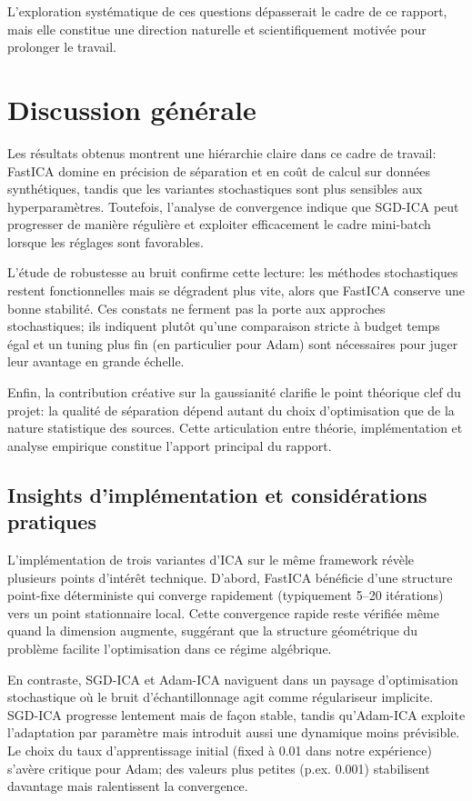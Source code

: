 \documentclass[11pt,a4paper]{article}
\begin{document}
L'exploration systématique de ces questions dépasserait le cadre de ce rapport, mais elle constitue une direction naturelle et scientifiquement motivée pour prolonger le travail.

\section{Discussion générale}

Les résultats obtenus montrent une hiérarchie claire dans ce cadre de travail: FastICA domine en précision de séparation et en coût de calcul sur données synthétiques, tandis que les variantes stochastiques sont plus sensibles aux hyperparamètres. Toutefois, l'analyse de convergence indique que SGD-ICA peut progresser de manière régulière et exploiter efficacement le cadre mini-batch lorsque les réglages sont favorables.

L'étude de robustesse au bruit confirme cette lecture: les méthodes stochastiques restent fonctionnelles mais se dégradent plus vite, alors que FastICA conserve une bonne stabilité. Ces constats ne ferment pas la porte aux approches stochastiques; ils indiquent plutôt qu'une comparaison stricte à budget temps égal et un tuning plus fin (en particulier pour Adam) sont nécessaires pour juger leur avantage en grande échelle.

Enfin, la contribution créative sur la gaussianité clarifie le point théorique clef du projet: la qualité de séparation dépend autant du choix d'optimisation que de la nature statistique des sources. Cette articulation entre théorie, implémentation et analyse empirique constitue l'apport principal du rapport.

\subsection{Insights d'implémentation et considérations pratiques}

L'implémentation de trois variantes d'ICA sur le même framework révèle plusieurs points d'intérêt technique. D'abord, FastICA bénéficie d'une structure point-fixe déterministe qui converge rapidement (typiquement 5--20 itérations) vers un point stationnaire local. Cette convergence rapide reste vérifiée même quand la dimension augmente, suggérant que la structure géométrique du problème facilite l'optimisation dans ce régime algébrique.

En contraste, SGD-ICA et Adam-ICA naviguent dans un paysage d'optimisation stochastique où le bruit d'échantillonnage agit comme régulariseur implicite. SGD-ICA progresse lentement mais de façon stable, tandis qu'Adam-ICA exploite l'adaptation par paramètre mais introduit aussi une dynamique moins prévisible. Le choix du taux d'apprentissage initial (fixed à 0.01 dans notre expérience) s'avère critique pour Adam; des valeurs plus petites (p.ex. 0.001) stabilisent davantage mais ralentissent la convergence.
\end{document}
